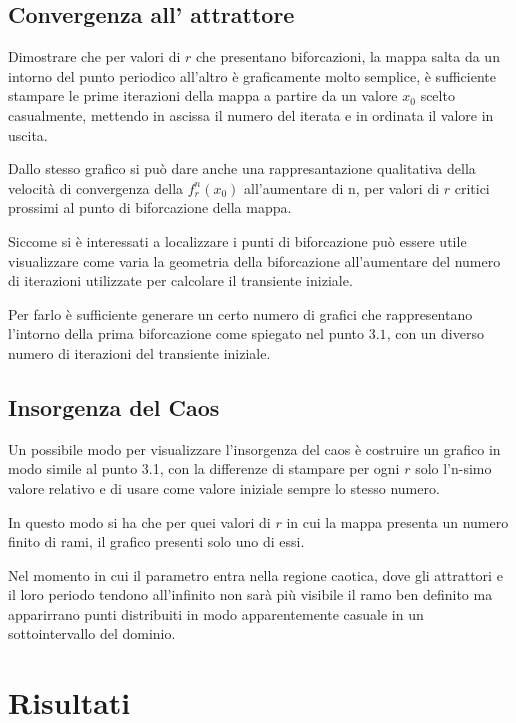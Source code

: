 \documentclass[13pt]{article}
\begin{document}
\subsection{Convergenza all' attrattore}

Dimostrare che per valori di $r$ che presentano biforcazioni, la mappa salta da un intorno del punto periodico all'altro è graficamente molto semplice, è sufficiente stampare le prime iterazioni della mappa a partire da un valore $x_{0}$ scelto casualmente, mettendo in ascissa il numero del iterata e in ordinata il valore in uscita.

Dallo stesso grafico si può dare anche una rappresantazione qualitativa della velocità di convergenza della $f^{n}_{r}(x_{0})$ all'aumentare di n, per valori di $r$ critici prossimi al punto di biforcazione della mappa.

Siccome si è interessati a localizzare i punti di biforcazione può essere utile visualizzare come varia la geometria della biforcazione all'aumentare del numero di iterazioni utilizzate per calcolare il transiente iniziale. 

Per farlo è sufficiente generare un certo numero di grafici che rappresentano l'intorno della prima biforcazione come spiegato nel punto $3.1$,  con un diverso numero di iterazioni del transiente iniziale.

\subsection{Insorgenza del Caos}

Un possibile modo per visualizzare l'insorgenza del caos è costruire un grafico in modo simile al punto 3.1, con la differenze di stampare per ogni $r$ solo l'n-simo valore relativo e di usare come valore iniziale sempre lo stesso numero.

In questo modo si ha che per quei valori di $r$ in cui la mappa presenta un numero finito di rami, il grafico presenti solo uno di essi.

Nel momento in cui il parametro entra nella regione caotica, dove gli attrattori e il loro periodo tendono all'infinito non sarà più visibile il ramo ben definito ma apparirrano punti distribuiti in modo apparentemente casuale in un sottointervallo del dominio.

\section{Risultati}
\end{document}
